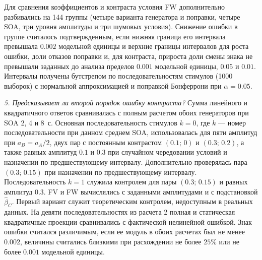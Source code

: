 Для сравнения коэффициентов и контраста условия FW дополнительно разбивались на 144 группы (четыре варианта генератора и поправки, четыре SOA, три уровня амплитуды и три шумовых условия). Снижение ошибки в группе считалось подтвержденным, если нижняя граница его интервала превышала $0.002$ модельной единицы и верхние границы интервалов для роста ошибки, доли отказов поправки и, для контраста, прироста доли смены знака не превышали заданных до анализа пределов $0.001$ модельной единицы, $0.05$ и $0.01$. Интервалы получены бутстрепом по последовательностям стимулов (1000 выборок) с нормальной аппроксимацией и поправкой Бонферрони при $\alpha=0.05$.

\textit{5. Предсказывает ли второй порядок ошибку контраста?} Сумма линейного и квадратичного ответов сравнивалась с полным расчетом обоих генераторов при SOA 2, 4 и 8~с. Основная последовательность стимулов $k=0$, где $k$ --- номер последовательности при данном среднем SOA, использовалась для пяти амплитуд при $a_B=a_A/2$, двух пар с постоянным контрастом $(0.1;\,0)$ и $(0.3;\,0.2)$, а также равных амплитуд $0.1$ и $0.3$ при случайном чередовании условий и назначении по предшествующему интервалу. Дополнительно проверялась пара $(0.3;\,0.15)$ при назначении по предшествующему интервалу. Последовательность $k=1$ служила контролем для пары $(0.3;\,0.15)$ и равных амплитуд $0.3$. FV и FW вычислялись с заданными амплитудами и с подстановкой $\hat\beta_C$. Первый вариант служит теоретическим контролем, недоступным в реальных данных. На девяти последовательностях из расчета 2 полная и статическая квадратичные проекции сравнивались с фактической нелинейной ошибкой. Знак ошибки считался различимым, если ее модуль в обоих расчетах был не менее $0.002$, величины считались близкими при расхождении не более $25\%$ или не более $0.001$ модельной единицы.

